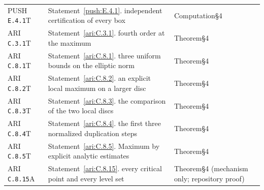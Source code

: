 \begin{longtable}{@{}L{.18\linewidth}L{.48\linewidth}L{.29\linewidth}@{}}
PUSH \nolinkurl{E.4.1}\newline T & Statement~\ref{push:E.4.1}. independent certification of every box\newline {} & Computation\newline §4\\
ARI \nolinkurl{C.3.1}\newline T & Statement~\ref{ari:C.3.1}. fourth order at the maximum\newline {} & Theorem\newline §4\\
ARI \nolinkurl{C.8.1}\newline T & Statement~\ref{ari:C.8.1}. three uniform bounds on the elliptic norm\newline {} & Theorem\newline §4\\
ARI \nolinkurl{C.8.2}\newline T & Statement~\ref{ari:C.8.2}. an explicit local maximum on a larger disc\newline {} & Theorem\newline §4\\
ARI \nolinkurl{C.8.3}\newline T & Statement~\ref{ari:C.8.3}. the comparison of the two local discs\newline {} & Theorem\newline §4\\
ARI \nolinkurl{C.8.4}\newline T & Statement~\ref{ari:C.8.4}. the first three normalized duplication steps\newline {} & Theorem\newline §4\\
ARI \nolinkurl{C.8.5}\newline T & Statement~\ref{ari:C.8.5}. Maximum by explicit analytic estimates\newline {} & Theorem\newline §4\\
ARI \nolinkurl{C.8.15}\newline A & Statement~\ref{ari:C.8.15}. every critical point and every level set\newline {} & Theorem\newline §4 (mechanism only; repository proof)\\

\end{longtable}
